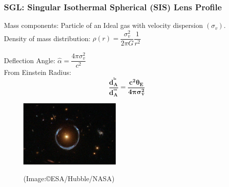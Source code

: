 \documentclass[xcolor=table,bigger]{beamer}
\begin{document}
\begin{frame}
 \frametitle{\textbf{SGL}: {\large Singular Isothermal Spherical (SIS) Lens {\normalsize Profile}}}
  Mass components: {\small Particle of an Ideal gas with velocity dispersion $(\sigma_v)$}.
 \vspace{3mm}\\

 Density of mass distribution: $\rho(r)=\dfrac{\sigma_{v}^{2}}{2 \pi G} \dfrac{1}{r^{2}}$
\vspace{3mm}\\

 \begin{minipage}{0.60\textwidth}



 Deflection Angle: $\hat{\alpha}=\dfrac{4 \pi \sigma_{v}^{2}}{c^{2}}$
\vspace{4mm}\\

 From Einstein Radius: 
$$
{\boxed{\boldsymbol{\dfrac{d_A^{^{ls}}}{d_A^{^{os}}}=\dfrac{c^2\theta_E}{4\pi \sigma_{{v}}^2}}}}
$$
\end{minipage}%
\hfill
\begin{minipage}{0.40\textwidth}
\begin{figure}[ht!]
\centering
\includegraphics[width=50mm]{Einstein_Ring} \\
\begin{scriptsize}
{(Image:\copyright ESA/Hubble/NASA)}

\end{scriptsize}\end{figure} 

\end{minipage}%
\end{frame}
\end{document}
